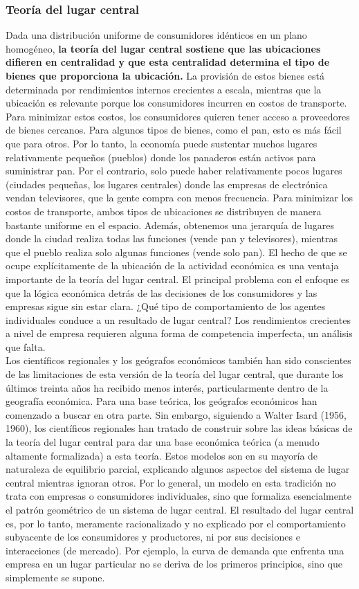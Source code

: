 \subsubsection{Teoría del lugar central}
Dada una distribución uniforme de consumidores idénticos en un plano homogéneo, \textbf{la teoría del lugar central sostiene que las ubicaciones difieren en centralidad y que esta centralidad determina el tipo de bienes que proporciona la ubicación.} La provisión de estos bienes está determinada por rendimientos internos crecientes a escala, mientras que la ubicación es relevante porque los consumidores incurren en costos de transporte. Para minimizar estos costos, los consumidores quieren tener acceso a proveedores de bienes cercanos. Para algunos tipos de bienes, como el pan, esto es más fácil que para otros. Por lo tanto, la economía puede sustentar muchos lugares relativamente pequeños (pueblos) donde los panaderos están activos para suministrar pan. Por el contrario, solo puede haber relativamente pocos lugares (ciudades pequeñas, los lugares centrales) donde las empresas de electrónica vendan televisores, que la gente compra con menos frecuencia. Para minimizar los costos de transporte, ambos tipos de ubicaciones se distribuyen de manera bastante uniforme en el espacio. Además, obtenemos una jerarquía de lugares donde la ciudad realiza todas las funciones (vende pan y televisores), mientras que el pueblo realiza solo algunas funciones (vende solo pan). 
El hecho de que se ocupe explícitamente de la ubicación de la actividad económica es una ventaja importante de la teoría del lugar central. El principal problema con el enfoque es que la lógica económica detrás de las decisiones de los consumidores y las empresas sigue sin estar clara. ¿Qué tipo de comportamiento de los agentes individuales conduce a un resultado de lugar central? Los rendimientos crecientes a nivel de empresa requieren alguna forma de competencia imperfecta, un análisis que falta. \\
Los científicos regionales y los geógrafos económicos también han sido conscientes de las limitaciones de esta versión de la teoría del lugar central, que durante los últimos treinta años ha recibido menos interés, particularmente dentro de la geografía económica. Para una base teórica, los geógrafos económicos han comenzado a buscar en otra parte. Sin embargo, siguiendo a Walter Isard (1956, 1960), los científicos regionales han tratado de construir sobre las ideas básicas de la teoría del lugar central para dar una base económica teórica (a menudo altamente formalizada) a esta teoría. Estos modelos son en su mayoría de naturaleza de equilibrio parcial, explicando algunos aspectos del sistema de lugar central mientras ignoran otros. Por lo general, un modelo en esta tradición no trata con empresas o consumidores individuales, sino que formaliza esencialmente el patrón geométrico de un sistema de lugar central. El resultado del lugar central es, por lo tanto, meramente racionalizado y no explicado por el comportamiento subyacente de los consumidores y productores, ni por sus decisiones e interacciones (de mercado). Por ejemplo, la curva de demanda que enfrenta una empresa en un lugar particular no se deriva de los primeros principios, sino que simplemente se supone. 

